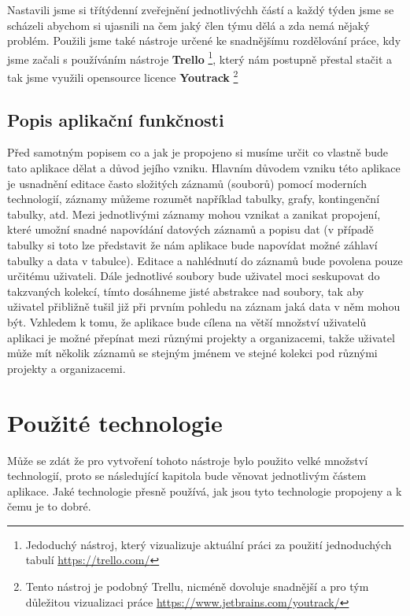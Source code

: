 \par Nastavili jsme si třítýdenní zveřejnění jednotlivýchh částí a každý týden jsme se scházeli abychom si ujasnili na čem jaký člen týmu dělá a zda nemá nějaký problém. Použili jsme také nástroje určené ke snadnějšímu rozdělování práce, kdy jsme začali s používáním nástroje \textbf{Trello} \footnote{Jedoduchý nástroj, který vizualizuje aktuální práci za použití jednoduchých tabulí \url{https://trello.com/}}, který nám postupně přestal stačit a tak jsme využili opensource licence \textbf{Youtrack} \footnote{Tento nástroj je podobný Trellu, nicméně dovoluje snadnější a pro tým důležitou vizualizaci práce \url{https://www.jetbrains.com/youtrack/}}

\subsection{Popis aplikační funkčnosti}
\par Před samotným popisem co a jak je propojeno si musíme určit co vlastně bude tato aplikace dělat a důvod jejího vzniku. Hlavním důvodem vzniku této aplikace je usnadnění editace často složitých záznamů (souborů) pomocí moderních technologií, záznamy můžeme rozumět například tabulky, grafy, kontingenční tabulky, atd. Mezi jednotlivými záznamy mohou vznikat a zanikat propojení, které umožní snadné napovídání datových záznamů a popisu dat (v případě tabulky si toto lze představit že nám aplikace bude napovídat možné záhlaví tabulky a data v tabulce). Editace a nahlédnutí do záznamů bude povolena pouze určitému uživateli. Dále jednotlivé soubory bude uživatel moci seskupovat do takzvaných kolekcí, tímto dosáhneme jisté abstrakce nad soubory, tak aby uživatel přibližně tušil již při prvním pohledu na záznam jaká data v něm mohou být. Vzhledem k tomu, že aplikace bude cílena na větší množství uživatelů aplikaci je možné přepínat mezi různými projekty a organizacemi, takže uživatel může mít několik záznamů se stejným jménem ve stejné kolekci pod různými projekty a organizacemi.

\section{Použité technologie}
\par Může se zdát že pro vytvoření tohoto nástroje bylo použito velké množství technologií, proto se následující kapitola bude věnovat jednotlivým částem aplikace. Jaké technologie přesně používá, jak jsou tyto technologie propojeny a k čemu je to dobré.

